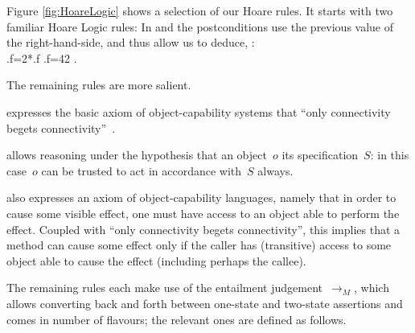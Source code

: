 Figure \ref{fig:HoareLogic} shows a selection of our Hoare rules. It starts with two familiar Hoare Logic rules: In   and   the postconditions
use the previous value of the
right-hand-side, and thus  allow us to deduce, \eg: \\ %
\SP \SP {} {.f=2*.f} {.f=42}  {\true}.
\\
%

The remaining rules are more salient.

 expresses the basic axiom of object-capability
systems that ``only connectivity begets connectivity''~\cite{MillerPhD}.

 allows reasoning under the hypothesis that
an object~$o$ \obeys its specification~$S$: in this case~$o$ can be trusted
to act in accordance with~$S$ always.


 also
expresses an axiom of object-capability languages, namely that
in order to cause some visible effect, one must have access to an object able
to perform the effect. Coupled with ``only connectivity begets connectivity'',
this implies that a method can cause some effect only if the caller has
(transitive) access to some object able to cause the effect (including
perhaps the callee).


The remaining rules each make use of the entailment judgement~$\rightarrow_M$,
which allows converting back and forth
between one-state and two-state
assertions and comes in number of flavours; the relevant ones are
defined as follows.

